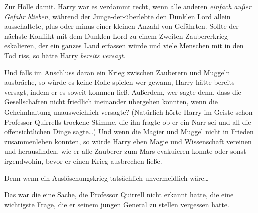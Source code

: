 Zur Hölle damit. Harry war es verdammt recht, wenn alle anderen \emph{einfach} \emph{außer Gefahr blieben}, während der Junge-der-überlebte den Dunklen Lord allein ausschaltete, plus oder minus einer kleinen Anzahl von Gefährten. Sollte der nächste Konflikt mit dem Dunklen Lord zu einem Zweiten Zaubererkrieg eskalieren, der ein ganzes Land erfassen würde und viele Menschen mit in den Tod riss, so hätte Harry \emph{bereits versagt.}

Und falls im Anschluss daran ein Krieg zwischen Zauberern und Muggeln ausbräche, so würde es keine Rolle spielen wer gewann, Harry hätte bereits versagt, indem er es soweit kommen ließ. Außerdem, wer sagte denn, dass die Gesellschaften nicht friedlich ineinander übergehen konnten, wenn die Geheimhaltung unausweichlich versagte? (Natürlich hörte Harry im Geiste schon Professor Quirrells trockene Stimme, die ihn fragte ob er ein Narr sei und all die offensichtlichen Dinge sagte…) Und wenn die Magier und Muggel nicht in Frieden zusammenleben konnten, so würde Harry eben Magie und Wissenschaft vereinen und herausfinden, wie er alle Zauberer zum Mars evakuieren konnte oder sonst irgendwohin, bevor er einen Krieg ausbrechen ließe.%

Denn wenn ein Auslöschungskrieg tatsächlich unvermeidlich wäre…

Das war die eine Sache, die Professor Quirrell nicht erkannt hatte, die eine wichtigste Frage, die er seinem jungen General zu stellen vergessen hatte.

